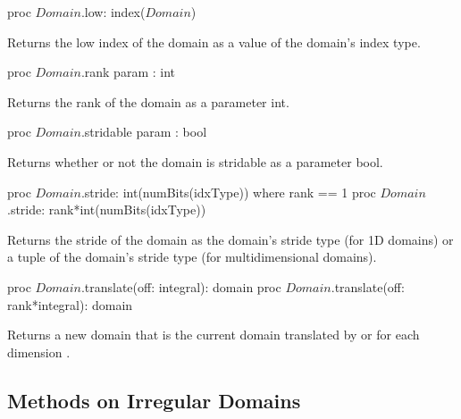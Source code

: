 \begin{protohead}
proc $Domain$.low: index($Domain$)
\end{protohead}
\begin{protobody}
Returns the low index of the domain as a value of the domain's index
type.
\end{protobody}

\begin{protohead}
proc $Domain$.rank param : int
\end{protohead}
\begin{protobody}
Returns the rank of the domain as a parameter int.
\end{protobody}

\begin{protohead}
proc $Domain$.stridable param : bool
\end{protohead}
\begin{protobody}
Returns whether or not the domain is stridable as a parameter bool.
\end{protobody}

\begin{protohead}
proc $Domain$.stride: int(numBits(idxType)) where rank == 1
proc $Domain$.stride: rank*int(numBits(idxType))
\end{protohead}
\begin{protobody}
Returns the stride of the domain as the domain's stride type (for 1D
domains) or a tuple of the domain's stride type (for multidimensional
domains).
\end{protobody}

\begin{protohead}
proc $Domain$.translate(off: integral): domain
proc $Domain$.translate(off: rank*integral): domain
\end{protohead}
\begin{protobody}
Returns a new domain that is the current domain translated
by  or  for each dimension .
\end{protobody}


\subsection{Methods on Irregular Domains}

